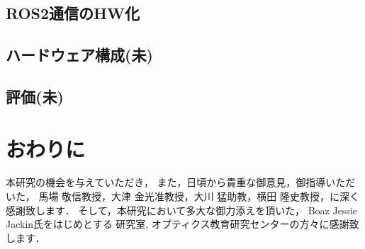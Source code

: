\documentclass[a4paper,11pt,fleqn]{jbook}
\begin{document}
\section{ROS2通信のHW化}
\label{chp:5_3}

\section{ハードウェア構成(未)}
\label{chp:5_4}

\section{評価(未)}
\label{chp:5_5}


\newpage
\chapter{おわりに}
\label{chp:outro}


\newpage
\acknowledgement
本研究の機会を与えていただき，
また，日頃から貴重な御意見，御指導いただいた，
馬場 敬信教授，大津 金光准教授，大川 猛助教，横田 隆史教授，に深く感謝致します．
そして，本研究において多大な御力添えを頂いた，
Boaz Jessie Jackin氏をはじめとする
研究室, オプティクス教育研究センターの方々に感謝致します．


\endacknowledgement

\newpage
{}

\endthebibliography
\end{document}
